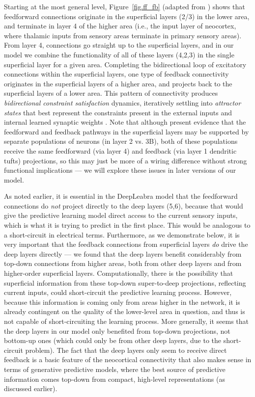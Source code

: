 \documentclass[11pt,twoside]{article}
\newif\myifpdf
\begin{document}
Starting at the most general level, Figure~\ref{fig.ff_fb} (adapted from ) shows that feedforward connections originate in the superficial layers (2/3) in the lower area, and terminate in layer 4 of the higher area (i.e., the input layer of neocortex, where thalamic inputs from sensory areas terminate in primary sensory areas).  From layer 4, connections go straight up to the superficial layers, and in our model we combine the functionality of all of these layers (4,2,3) in the single superficial layer for a given area.  Completing the bidirectional loop of excitatory connections within the superficial layers, one type of feedback connectivity originates in the superficial layers of a higher area, and projects back to the superficial layers of a lower area.  This pattern of connectivity produces {\em bidirectional constraint satisfaction} dynamics, iteratively settling into {\em attractor states} that best represent the constraints present in the external inputs and internal learned synaptic weights \cite{Hopfield82,Hopfield84,AckleyHintonSejnowski85,RumelhartMcClelland82}.  Note that although  present evidence that the feedforward and feedback pathways in the superficial layers may be supported by separate populations of neurons (in layer 2 vs. 3B), both of these populations receive the same feedforward (via layer 4) and feedback (via layer 1 dendritic tufts) projections, so this may just be more of a wiring difference without strong functional implications --- we will explore these issues in later versions of our model.

As noted earlier, it is essential in the DeepLeabra model that the feedforward connections do {\em not} project directly to the deep layers (5,6), because that would give the predictive learning model direct access to the current sensory inputs, which is what it is trying to predict in the first place.  This would be analogous to a short-circuit in electrical terms.  Furthermore, as we demonstrate below, it is very important that the feedback connections from superficial layers {\em do} drive the deep layers directly --- we found that the deep layers benefit considerably from top-down connections from higher areas, both from other deep layers and from higher-order superficial layers.  Computationally, there is the possibility that superficial information from these top-down super-to-deep projections, reflecting current inputs, could short-circuit the predictive learning process.  However, because this information is coming only from areas higher in the network, it is already contingent on the quality of the lower-level area in question, and thus is not capable of short-circuiting the learning process.  More generally, it seems that the deep layers in our model only benefited from top-down projections, not bottom-up ones (which could only be from other deep layers, due to the short-circuit problem).  The fact that the deep layers only seem to receive direct feedback is a basic feature of the neocortical connectivity that also makes sense in terms of generative predictive models, where the best source of predictive information comes top-down from compact, high-level representations (as discussed earlier).
\end{document}
